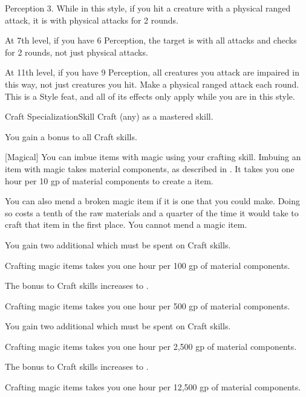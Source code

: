     \featpres Perception 3.
    \featben While in this style, if you hit a creature with a physical ranged attack, it is \impaired with physical attacks for 2 rounds.

    At 7th level, if you have 6 Perception, the target is \impaired with all attacks and checks for 2 rounds, not just physical attacks.

    At 11th level, if you have 9 Perception, all creatures you attack are impaired in this way, not just creatures you hit.
    \stylereq Make a physical ranged attack each round.
     This is a Style feat, and all of its effects only apply while you are in this style.

    \begin{feat}{Craft Specialization}{Skill}
        \featpre Craft (any) as a mastered skill.
        \featben
    
         You gain a  bonus to all Craft skills.
    
        [Magical] You can imbue items with magic using your crafting skill.
        Imbuing an item with magic takes material components, as described in .
        It takes you one hour per 10 gp of material components to create a item.

        You can also mend a broken magic item if it is one that you could make.
        Doing so costs a tenth of the raw materials and a quarter of the time it would take to craft that item in the first place.
        You cannot mend a  magic item.

         You gain two additional  which must be spent on Craft skills.

         Crafting magic items takes you one hour per 100 gp of material components.

         The bonus to Craft skills increases to .

         Crafting magic items takes you one hour per 500 gp of material components.

         You gain two additional  which must be spent on Craft skills.

         Crafting magic items takes you one hour per 2,500 gp of material components.

         The bonus to Craft skills increases to .

         Crafting magic items takes you one hour per 12,500 gp of material components.
    \end{feat}

